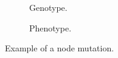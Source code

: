 \begin{figure}[htb]
    \begin{mdframed}
        \begin{subfigure}[b]{0.45\textwidth}
            \centering
            \resizebox{1\textwidth}{!}{}
            \caption{Genotype.}
            \label{node_genotype}
        \end{subfigure}
        \begin{subfigure}[b]{0.45\textwidth}
            \centering
            \resizebox{0.65\textwidth}{!}{}
            \caption{Phenotype.}
            \label{node_phenotype}
        \end{subfigure}
    \end{mdframed}
    \caption{Example of a node mutation.}
    \label{node_mutation}
\end{figure}
